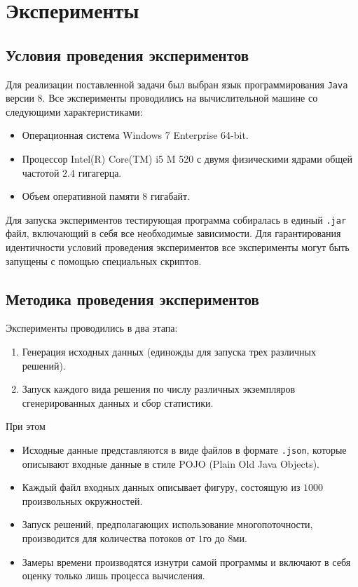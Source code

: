 \section{Эксперименты}

\subsection{Условия проведения экспериментов}

Для реализации поставленной задачи был выбран язык программирования \texttt{Java} версии $8$. Все эксперименты проводились на 
вычислительной машине со следующими характеристиками:
\begin{itemize}
    \item Операционная система Windows 7 Enterprise 64-bit.
    \item Процессор Intel(R) Core(TM) i5 M 520 с двумя физическими ядрами общей частотой $2.4$ гигагерца.
    \item Объем оперативной памяти $8$ гигабайт.
\end{itemize}

Для запуска экспериментов тестирующая программа собиралась в единый \texttt{.jar} файл, включающий в себя все необходимые 
зависимости. Для гарантирования идентичности условий проведения экспериментов все эксперименты могут быть запущены с помощью 
специальных скриптов.

\subsection{Методика проведения экспериментов}

Эксперименты проводились в два этапа:
\begin{enumerate}
    \item Генерация исходных данных (единожды для запуска трех различных решений).
    \item Запуск каждого вида решения по числу различных экземпляров сгенерированных данных и сбор статистики. 
\end{enumerate}
При этом
\begin{itemize}
    \item Исходные данные представляются в виде файлов в формате \texttt{.json}, которые описывают входные данные в стиле POJO 
        (Plain Old Java Objects).
    \item Каждый файл входных данных описывает фигуру, состоящую из $1000$ произвольных окружностей.
    \item Запуск решений, предполагающих использование многопоточности, производится для количества потоков от $1$го до $8$ми.
    \item Замеры времени производятся изнутри самой программы и включают в себя оценку только лишь процесса вычисления.
\end{itemize}

